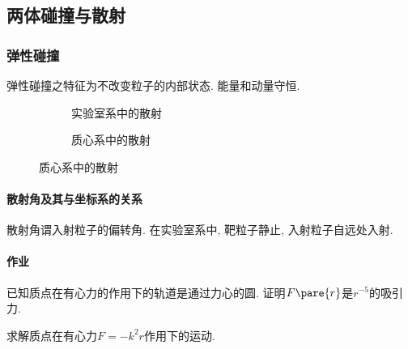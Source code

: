 \documentclass{ctexart}
\begin{document}



\subsection{两体碰撞与散射} %
\label{sub:两体碰撞与散射}

\subsubsection{弹性碰撞} %
\label{ssub:弹性碰撞}

弹性碰撞之特征为不改变粒子的内部状态. 能量和动量守恒.

\begin{figure}[ht]
    \centering
    \begin{subfigure}{5cm}
        \centering
        \caption{实验室系中的散射}
    \end{subfigure}
    \begin{subfigure}{5cm}
        \centering
        \caption{质心系中的散射}
    \end{subfigure}
\end{figure}

\paragraph{散射角及其与坐标系的关系} %
\label{par:散射角及其与坐标系的关系}

散射角谓入射粒子的偏转角. 在实验室系中, 靶粒子静止, 入射粒子自远处入射.


\paragraph{作业} %
\label{par:作业}

已知质点在有心力的作用下的轨道是通过力心的圆. 证明$F\pare{r}$是$r^{-5}$的吸引力.
\par
求解质点在有心力$F = -k^2r$作用下的运动.

\end{document}
